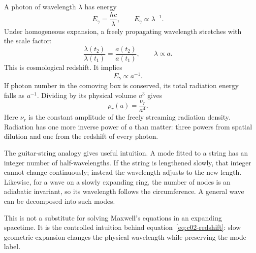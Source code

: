 A photon of wavelength \(\lambda\) has energy
\begin{equation}
E_\gamma=\frac{hc}{\lambda},
\qquad
E_\gamma\propto\lambda^{-1}.
\label{eq:c02-photon-energy}
\end{equation}
Under homogeneous expansion, a freely propagating wavelength stretches with the scale factor:
\begin{equation}
\frac{\lambda(t_2)}{\lambda(t_1)}
=\frac{a(t_2)}{a(t_1)},
\qquad
\lambda\propto a.
\label{eq:c02-redshift}
\end{equation}
This is cosmological redshift. It implies
\begin{equation}
E_\gamma\propto a^{-1}.
\label{eq:c02-photon-redshift}
\end{equation}
If photon number in the comoving box is conserved, its total radiation energy falls as \(a^{-1}\). Dividing by its physical volume \(a^3\) gives
\begin{equation}
\boxed{\rho_r(a)=\frac{\nu_r}{a^4}.}
\label{eq:c02-radiation-density}
\end{equation}
Here \(\nu_r\) is the constant amplitude of the freely streaming radiation density. Radiation has one more inverse power of \(a\) than matter: three powers from spatial dilution and one from the redshift of every photon.

The guitar-string analogy gives useful intuition. A mode fitted to a string has an integer number of half-wavelengths. If the string is lengthened slowly, that integer cannot change continuously; instead the wavelength adjusts to the new length. Likewise, for a wave on a slowly expanding ring, the number of nodes is an adiabatic invariant, so its wavelength follows the circumference. A general wave can be decomposed into such modes.

This is not a substitute for solving Maxwell's equations in an expanding spacetime. It is the controlled intuition behind equation~\eqref{eq:c02-redshift}: slow geometric expansion changes the physical wavelength while preserving the mode label.

\begin{classroomqa}
\end{classroomqa}

